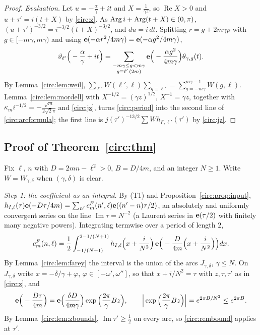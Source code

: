 \begin{proof}
\emph{Evaluation.} Let $u=-\frac\alpha\gamma+it$ and $X=\frac1{\gamma z}$, so $\operatorname{Re}X>0$ and $u+\tau'=i(t+X)$ by \eqref{circ:z}. As $\operatorname{Arg} i+\operatorname{Arg}(t+X)\in(0,\pi)$, $(u+\tau')^{-3/2}=i^{-3/2}(t+X)^{-3/2}$, and $du=i\,dt$. Splitting $r=g+2m\gamma p$ with $g\in[-m\gamma,m\gamma)$ and using $\mathbf e(-\alpha r^2/4m\gamma)=\mathbf e(-\alpha g^2/4m\gamma)$,
\[
\vartheta_{\ell'}\Big(-\frac\alpha\gamma+it\Big)=\sum_{\substack{-m\gamma\le g<m\gamma\\ g\equiv\ell'\,(2m)}}\mathbf e\Big(-\frac{\alpha g^2}{4m\gamma}\Big)\theta_{\gamma,g}(t).
\]
By Lemma~\ref{circ:lem:weil}, $\sum_{\ell'}W(\ell',\ell)\sum_{g\equiv\ell'}=\sum_{g=-m\gamma}^{m\gamma-1}W(g,\ell)$. Lemma~\ref{circ:lem:mordell} with $X^{-1/2}=(\gamma z)^{1/2}$, $X^{-1}=\gamma z$, together with $\kappa_m i^{-1/2}=-\frac{\sqrt m}{2\sqrt2\pi}$ and \eqref{circ:jz}, turns \eqref{circ:period} into the second line of \eqref{circ:arcformula}; the first line is $j(\tau')^{-13/2}\sum W h_{F,\ell'}(\tau')$ by \eqref{circ:jz}.
\end{proof}

\subsection{Proof of Theorem~\ref{circ:thm}}\label{circ:proof}
Fix $\ell$, $n$ with $D=2mn-\ell^2>0$, $B=D/4m$, and an integer $N\ge1$. Write $W=W_{\gamma,\delta}$ when $(\gamma,\delta)$ is clear.

\emph{Step 1: the coefficient as an integral.} By (T1) and Proposition~\ref{circ:prop:input}, $h_{I,\ell}(\tau)\mathbf e(-D\tau/4m)=\sum_{n'}c^F_m(n',\ell)\mathbf e((n'-n)\tau/2)$, an absolutely and uniformly convergent series on the line $\operatorname{Im}\tau=N^{-2}$ (a Laurent series in $\mathbf e(\tau/2)$ with finitely many negative powers). Integrating termwise over a period of length $2$,
\begin{equation}\label{circ:cauchy}
c^F_m(n,\ell)=\frac12\int_{-1/(N+1)}^{2-1/(N+1)}h_{I,\ell}\Big(x+\frac i{N^2}\Big)\,\mathbf e\Big(-\frac D{4m}\Big(x+\frac i{N^2}\Big)\Big)dx .
\end{equation}
By Lemma~\ref{circ:lem:farey} the interval is the union of the arcs $J_{\gamma,\delta}$, $\gamma\le N$. On $J_{\gamma,\delta}$ write $x=-\delta/\gamma+\varphi$, $\varphi\in[-\omega',\omega'']$, so that $x+i/N^2=\tau$ with $z,\tau,\tau'$ as in \eqref{circ:z}, and
\begin{equation}\label{circ:phaseD}
\mathbf e\Big(-\frac{D\tau}{4m}\Big)=\mathbf e\Big(\frac{\delta D}{4m\gamma}\Big)\exp\Big(\frac{2\pi}\gamma Bz\Big),\qquad\Big|\exp\Big(\frac{2\pi}\gamma Bz\Big)\Big|=e^{2\pi B/N^2}\le e^{2\pi B}.
\end{equation}
By Lemma~\ref{circ:lem:zbounds}, $\operatorname{Im}\tau'\ge\frac12$ on every arc, so \eqref{circ:rembound} applies at $\tau'$.

